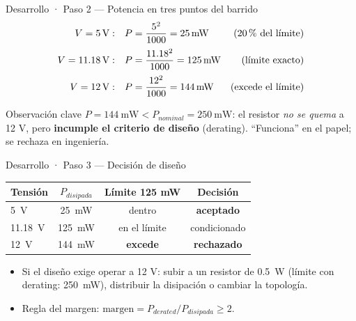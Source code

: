 \documentclass[aspectratio=169]{beamer}
\begin{document}
\begin{frame}{Desarrollo · Paso 2 — Potencia en tres puntos del barrido}
  \begin{align*}
    V = \SI{5}{\volt}:    &\quad P = \frac{5^2}{1000} = \SI{25}{\milli\watt}    &(\text{20\,\% del límite})\\[2pt]
    V = \SI{11.18}{\volt}: &\quad P = \frac{11.18^2}{1000} = \SI{125}{\milli\watt} &(\text{límite exacto})\\[2pt]
    V = \SI{12}{\volt}:   &\quad P = \frac{12^2}{1000} = \SI{144}{\milli\watt}  &(\text{excede el límite})
  \end{align*}
  \pause
  \begin{alertblock}{Observación clave}
    $P = \SI{144}{\milli\watt} < P_{nominal} = \SI{250}{\milli\watt}$: el resistor
    \emph{no se quema} a 12 V, pero \textbf{incumple el criterio de diseño} (derating).
    ``Funciona'' en el papel; se rechaza en ingeniería.
  \end{alertblock}
\end{frame}

\begin{frame}{Desarrollo · Paso 3 — Decisión de diseño}
  \begin{table}
    \begin{tabular}{lccc}
      \toprule
      Tensión & $P_{disipada}$ & Límite 125 mW & Decisión \\
      \midrule
      \SI{5}{\volt}    & \SI{25}{\milli\watt}   & dentro & \textbf{aceptado} \\
      \SI{11.18}{\volt} & \SI{125}{\milli\watt} & en el límite & condicionado \\
      \SI{12}{\volt}   & \SI{144}{\milli\watt}  & \textbf{excede} & \textbf{rechazado} \\
      \bottomrule
    \end{tabular}
  \end{table}
  \pause
  \begin{itemize}
    \item Si el diseño exige operar a 12 V: subir a un resistor de \SI{0.5}{\watt}
      (límite con derating: \SI{250}{\milli\watt}), distribuir la disipación o
      cambiar la topología.
    \item Regla del margen: $\text{margen} = P_{derated}/P_{disipada} \ge 2$.
  \end{itemize}
\end{frame}
\end{document}
